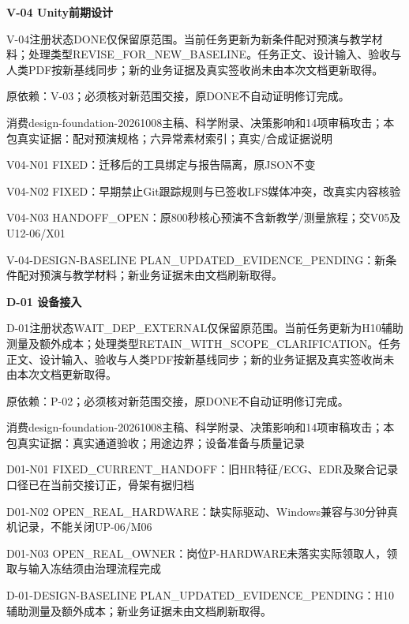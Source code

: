 \documentclass[11pt,a4paper]{article}
\newcommand{\reviewsection}[1]{\par\Needspace{5\baselineskip}\vspace{10pt}\begin{center}{\titlelatin\titlecjk\bfseries\fontsize{14}{20}\selectfont #1}\end{center}}
\begin{document}
\reviewsection{V-\allowbreak{}04 Unity前期设计}
V-\allowbreak{}04注册状态DONE仅保留原范围。当前任务更新为新条件配对预演与教学材料；处理类型REVISE\_\allowbreak{}FOR\_\allowbreak{}NEW\_\allowbreak{}BASELINE。任务正文、设计输入、验收与人类PDF按新基线同步；新的业务证据及真实签收尚未由本次文档更新取得。


原依赖：V-\allowbreak{}03；必须核对新范围交接，原DONE不自动证明修订完成。


消费design-\allowbreak{}foundation-\allowbreak{}20261008主稿、科学附录、决策影响和14项审稿攻击；本包真实证据：配对预演规格；六异常素材索引；真实/\allowbreak{}合成证据说明


V04-\allowbreak{}N01 FIXED：迁移后的工具绑定与报告隔离，原JSON不变


V04-\allowbreak{}N02 FIXED：早期禁止Git跟踪规则与已签收LFS媒体冲突，改真实内容核验


V04-\allowbreak{}N03 HANDOFF\_\allowbreak{}OPEN：原800秒核心预演不含新教学/\allowbreak{}测量旅程；交V05及U12-\allowbreak{}06/\allowbreak{}X01


V-\allowbreak{}04-\allowbreak{}DESIGN-\allowbreak{}BASELINE PLAN\_\allowbreak{}UPDATED\_\allowbreak{}EVIDENCE\_\allowbreak{}PENDING：新条件配对预演与教学材料；新业务证据未由文档刷新取得。


\reviewsection{D-\allowbreak{}01 设备接入}
D-\allowbreak{}01注册状态WAIT\_\allowbreak{}DEP\_\allowbreak{}EXTERNAL仅保留原范围。当前任务更新为H10辅助测量及额外成本；处理类型RETAIN\_\allowbreak{}WITH\_\allowbreak{}SCOPE\_\allowbreak{}CLARIFICATION。任务正文、设计输入、验收与人类PDF按新基线同步；新的业务证据及真实签收尚未由本次文档更新取得。


原依赖：P-\allowbreak{}02；必须核对新范围交接，原DONE不自动证明修订完成。


消费design-\allowbreak{}foundation-\allowbreak{}20261008主稿、科学附录、决策影响和14项审稿攻击；本包真实证据：真实通道验收；用途边界；设备准备与质量记录


D01-\allowbreak{}N01 FIXED\_\allowbreak{}CURRENT\_\allowbreak{}HANDOFF：旧HR特征/\allowbreak{}ECG、EDR及聚合记录口径已在当前交接订正，骨架有据归档


D01-\allowbreak{}N02 OPEN\_\allowbreak{}REAL\_\allowbreak{}HARDWARE：缺实际驱动、Windows兼容与30分钟真机记录，不能关闭UP-\allowbreak{}06/\allowbreak{}M06


D01-\allowbreak{}N03 OPEN\_\allowbreak{}REAL\_\allowbreak{}OWNER：岗位P-\allowbreak{}HARDWARE未落实实际领取人，领取与输入冻结须由治理流程完成


D-\allowbreak{}01-\allowbreak{}DESIGN-\allowbreak{}BASELINE PLAN\_\allowbreak{}UPDATED\_\allowbreak{}EVIDENCE\_\allowbreak{}PENDING：H10辅助测量及额外成本；新业务证据未由文档刷新取得。
\end{document}
